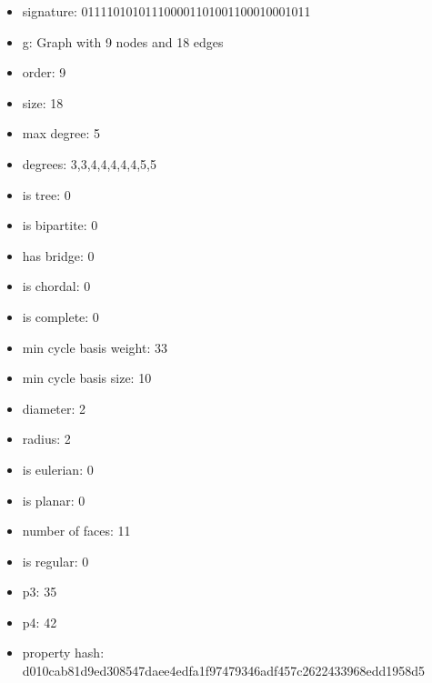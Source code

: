 \newpage
\begin{figure}
\end{figure}
\begin{itemize}
\item signature: 011110101011100001101001100010001011
\item g: Graph with 9 nodes and 18 edges
\item order: 9
\item size: 18
\item max degree: 5
\item degrees: 3,3,4,4,4,4,4,5,5
\item is tree: 0
\item is bipartite: 0
\item has bridge: 0
\item is chordal: 0
\item is complete: 0
\item min cycle basis weight: 33
\item min cycle basis size: 10
\item diameter: 2
\item radius: 2
\item is eulerian: 0
\item is planar: 0
\item number of faces: 11
\item is regular: 0
\item p3: 35
\item p4: 42
\item property hash: d010cab81d9ed308547daee4edfa1f97479346adf457c2622433968edd1958d5
\end{itemize}
